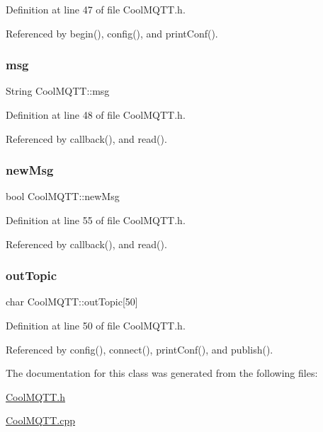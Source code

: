 Definition at line 47 of file Cool\+M\+Q\+T\+T.\+h.



Referenced by begin(), config(), and print\+Conf().

\mbox{\label{classCoolMQTT_af6b19e7074dbbb4ae493c44dcb53f7ff}} 
\subsubsection{\texorpdfstring{msg}{msg}}
{\footnotesize\ttfamily String Cool\+M\+Q\+T\+T\+::msg\hspace{0.3cm}{\ttfamily [private]}}



Definition at line 48 of file Cool\+M\+Q\+T\+T.\+h.



Referenced by callback(), and read().

\mbox{\label{classCoolMQTT_a3240388137b885775aadf38e96b24c6b}} 
\subsubsection{\texorpdfstring{new\+Msg}{newMsg}}
{\footnotesize\ttfamily bool Cool\+M\+Q\+T\+T\+::new\+Msg\hspace{0.3cm}{\ttfamily [private]}}



Definition at line 55 of file Cool\+M\+Q\+T\+T.\+h.



Referenced by callback(), and read().

\mbox{\label{classCoolMQTT_a109c786a17b463f9eeba046194279522}} 
\subsubsection{\texorpdfstring{out\+Topic}{outTopic}}
{\footnotesize\ttfamily char Cool\+M\+Q\+T\+T\+::out\+Topic\mbox{[}50\mbox{]}\hspace{0.3cm}{\ttfamily [private]}}



Definition at line 50 of file Cool\+M\+Q\+T\+T.\+h.



Referenced by config(), connect(), print\+Conf(), and publish().



The documentation for this class was generated from the following files\+:\begin{DoxyCompactItemize}
\item 
\hyperlink{CoolMQTT_8h}{Cool\+M\+Q\+T\+T.\+h}\item 
\hyperlink{CoolMQTT_8cpp}{Cool\+M\+Q\+T\+T.\+cpp}\end{DoxyCompactItemize}
